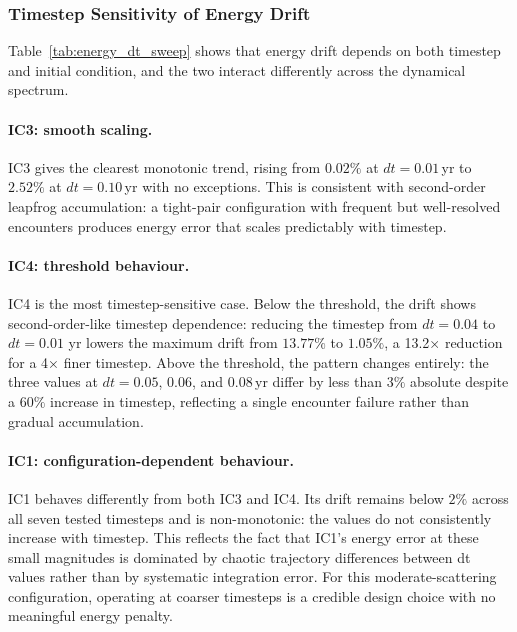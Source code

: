 \documentclass[12pt]{article}
\begin{document}
\subsubsection{Timestep Sensitivity of Energy Drift}
\label{sec:dt_scaling}

Table~\ref{tab:energy_dt_sweep} shows that energy drift depends on
both timestep and initial condition, and the two interact differently
across the dynamical spectrum.

\paragraph{IC3: smooth scaling.}
IC3 gives the clearest monotonic trend, rising from $0.02\%$ at
$dt=0.01$\,yr to $2.52\%$ at $dt=0.10$\,yr with no exceptions. This
is consistent with second-order leapfrog accumulation: a tight-pair
configuration with frequent but well-resolved encounters produces
energy error that scales predictably with timestep.

\paragraph{IC4: threshold behaviour.}
IC4 is the most timestep-sensitive case. Below the threshold, the drift shows second-order-like timestep dependence:
reducing the timestep from $dt = 0.04$ to $dt = 0.01$ yr lowers the maximum
drift from $13.77\%$ to $1.05\%$, a 13.2× reduction for a 4× finer timestep. Above the
threshold, the pattern changes entirely: the three values at
$dt=0.05$, $0.06$, and $0.08$\,yr differ by less than $3\%$ absolute
despite a $60\%$ increase in timestep, reflecting a single
encounter failure rather than gradual accumulation.

\paragraph{IC1: configuration-dependent behaviour.}
IC1 behaves differently from both IC3 and IC4. Its drift remains
below $2\%$ across all seven tested timesteps and is non-monotonic:
the values do not consistently increase with timestep. This reflects
the fact that IC1's energy error at these small magnitudes is
dominated by chaotic trajectory differences between dt values rather
than by systematic integration error. For this moderate-scattering
configuration, operating at coarser timesteps is a credible design
choice with no meaningful energy penalty.
\end{document}
